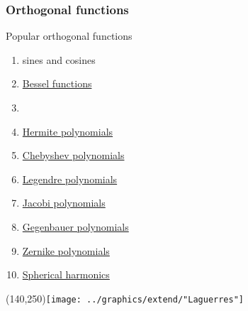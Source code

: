 \documentclass[handout]{beamer}
\begin{document}
\begin{frame}      %
\frametitle{Orthogonal functions}
  Popular orthogonal functions
  \begin{enumerate}
    \item sines and cosines
    \item \href{http://mathworld.wolfram.com/BesselFunction.html}{Bessel functions}
    \item \href{http://mathworld.wolfram.com/LaguerrePolynomial.html}{}
    \item \href{http://mathworld.wolfram.com/HermitePolynomial.html}{Hermite polynomials}
    \item \href{http://mathworld.wolfram.com/ChebyshevPolynomialoftheFirstKind.html}{Chebyshev polynomials}
    \item \href{http://mathworld.wolfram.com/LegendrePolynomial.html}{Legendre polynomials}
    \item \href{http://mathworld.wolfram.com/JacobiPolynomial.html}{Jacobi polynomials}
    \item \href{http://mathworld.wolfram.com/GegenbauerPolynomial.html}{Gegenbauer polynomials}
    \item \href{http://mathworld.wolfram.com/ZernikePolynomial.html}{Zernike polynomials}
    \item \href{http://mathworld.wolfram.com/SphericalHarmonic.html}{Spherical harmonics}
  \end{enumerate}
    \Put(140,250){\texttt{[image: ../graphics/extend/"Laguerres"]}}
\end{frame}
\end{document}

